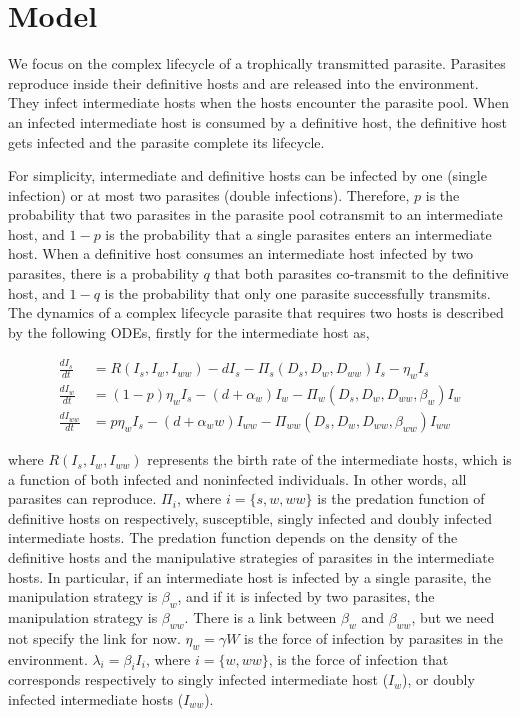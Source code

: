 \documentclass{article}
\begin{document}
\section{Model}
We focus on the complex lifecycle of a trophically transmitted parasite. 
Parasites reproduce inside their definitive hosts and are released into the environment. 
They infect intermediate hosts when the hosts encounter the parasite pool. 
When an infected intermediate host is consumed by a definitive host, the definitive host gets infected and the parasite complete its lifecycle.

For simplicity, intermediate and definitive hosts can be infected by one (single infection) or at most two parasites (double infections). 
Therefore, $p$ is the probability that two parasites in the parasite pool cotransmit to an intermediate host, and $1-p$ is the probability that a single parasites enters an intermediate host. 
When a definitive host consumes an intermediate host infected by two parasites, there is a probability $q$ that both parasites co-transmit to the definitive host, and $1-q$ is the probability that only one parasite successfully transmits. 
The dynamics of a complex lifecycle parasite that requires two hosts is described by the following ODEs, firstly for the intermediate host as,

\begin{align}
\frac{dI_s}{dt} &= R(I_s, I_w, I_{ww}) - d I_s - \Pi_s(D_s, D_w, D_{ww}) I_s  - \eta_w  I_s \\ 
\frac{dI_w}{dt} &=  (1 - p) \eta_w I_s  - (d + \alpha_w) I_w - \Pi_w(D_s, D_w, D_{ww}, \beta_w) I_w \\
\frac{dI_{ww}}{dt} &= p \eta_w I_s  - (d + \alpha_ww) I_{ww} - \Pi_{ww}(D_s, D_w, D_{ww}, \beta_{ww}) I_{ww}
\end{align}

where  $R(I_s, I_w, I_{ww})$ represents the birth rate of the intermediate hosts, which is a function of both infected and noninfected individuals. 
In other words, all parasites can reproduce. 
$\Pi_i$, where $i = \{s, w, ww\}$ is the predation function of definitive hosts on respectively, susceptible, singly infected and doubly infected intermediate hosts. 
The predation function depends on the density of the definitive hosts and the manipulative strategies of parasites in the intermediate hosts. 
In particular, if an intermediate host is infected by a single parasite, the manipulation strategy is $\beta_w$, and if it is infected by two parasites, the manipulation strategy is $\beta_{ww}$. 
There is a link between $\beta_w$ and $\beta_{ww}$, but we need not specify the link for now. 
$\eta_w = \gamma W$ is the force of infection by parasites in the environment. 
$\lambda_i = \beta_i I_i$, where $i = \{ w, ww\}$, is the force of infection that corresponds respectively to singly infected intermediate host ($I_w$), or doubly infected intermediate hosts ($I_{ww}$). 
\end{document}
